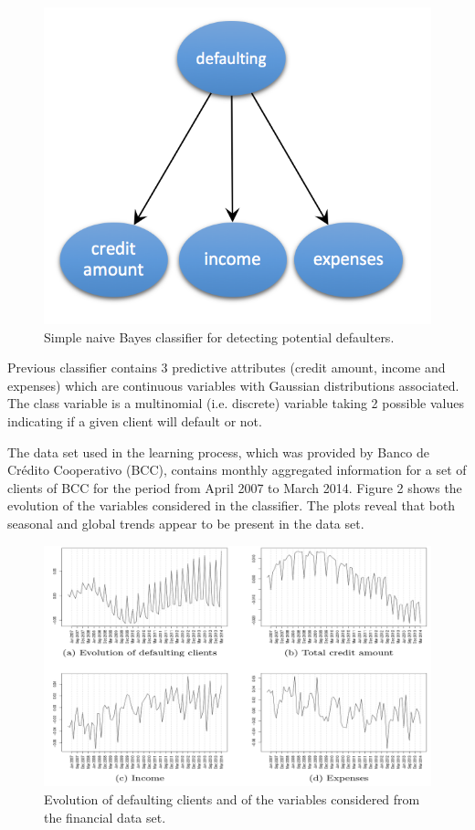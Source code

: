 \documentclass[10pt,a4paper]{article}
\begin{document}
\begin{figure}[h!]
	\centering
	\includegraphics[width=13cm]{img/defaulters_nb.png}
	\caption{Simple naive Bayes classifier for detecting potential defaulters.}
	\label{fig:blog_conceptdrift:what:nb}	
\end{figure}

Previous classifier contains 3 predictive attributes (credit amount, income and expenses) which are continuous variables with Gaussian distributions associated. The class variable is a multinomial (i.e. discrete) variable taking 2 possible values indicating if a given client will default or not.\newline  

The data set used in the learning process, which was provided by Banco de Cr{\'e}dito Cooperativo (BCC), contains monthly aggregated information for a set of clients of BCC for the period from April 2007 to March 2014.  Figure 2 shows the evolution of the variables considered in the classifier. The plots reveal that both seasonal and global trends appear to be present in the data set.

\begin{figure}[h!]
	\centering
	\includegraphics[width=13cm]{img/graphics_cd.png}
	\caption{Evolution of defaulting clients and of the variables considered from the financial data set.}
	\label{fig:blog_conceptdrift:what:graphics_cd}	
\end{figure}
\end{document}
